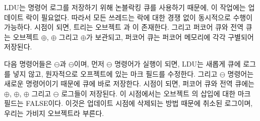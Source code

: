 LDU는 명령어 로그를 저장하기 위해 논블락킹 큐를 사용하기 때문에, 이 작업에는 업데이트 락이 필요없다.
따라서 모든 쓰레드는 락에 대한 경쟁 없이 동시적으로 수행이 가능하다.
 시점이 되면, 트리는 오브젝트 과 이 존재한다.
그리고 퍼코어 큐와 전역 큐는 오브젝트 $\oplus$, $\oplus$ 그리고
$\oplus$가 보관되고, 퍼코어 큐는 퍼코어 메모리에 각각 구별되어 저장된다.

다음 명령어들은 $\ominus$과 $\ominus$이며,
먼저 $\ominus$ 명령어가 실행이 되면, LDU는 새롭게 큐에 로그를 넣지 않고, 
원자적으로 오프젝트에 있는 마크 필드를 수정한다. 
그리고 $\ominus$ 명령어는 새로운 명령어이기 때문에 큐에 바로 저장한다. 
 시점이 되면, 퍼코어 큐와 전역 큐에는 $\oplus$, $\oplus$,
$\oplus$ 그리고 $\ominus$ 로그들이 저장된다. 
이 시점에서는 오브젝트 의 삽입에 대한 마크 필드는 FALSE이다. 
이것은 업데이트 시점에 삭제되는 방법 때문에 취소된 로그이며, 우리는
가비지 오브젝트라 부른다.

